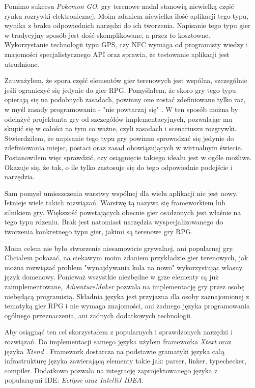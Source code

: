 \documentclass[openright]{xmgr}
\begin{document}
Pomimo sukcesu \textit{Pokemon GO}, gry terenowe nadal stanowią niewielką część rynku rozrywki elektronicznej. Moim zdaniem niewielka ilość aplikacji tego typu, wynika z braku odpowiednich narzędzi do ich tworzenia. Napisanie tego typu gier w tradycyjny sposób jest dość skomplikowane, a przez to kosztowne. Wykorzystanie technologii typu GPS, czy NFC wymaga od programisty wiedzy i znajomości specjalistycznego API oraz sprawia, że testowanie aplikacji jest utrudnione.

Zauważyłem, że spora część elementów gier terenowych jest wspólna, szczególnie jeśli ograniczyć się jedynie do gier RPG. Pomyślałem, że skoro gry tego typu opierają się na podobnych zasadach, powinny one zostać zdefiniowane tylko raz, w myśl zasady programowania - "nie powtarzaj się" \cite{CleanCode:2005}. W ten sposób można by odciążyć projektanta gry od szczegółów implementacyjnych, pozwalając mu skupić się w całości na tym co ważne, czyli zasadach i scenariuszu rozgrywki. Stwierdziłem, że napisanie tego typu gry powinno sprowadzać się jedynie do zdefiniowania miejsc, postaci oraz zasad obowiązujących w wirtualnym świecie. Postanowiłem więc sprawdzić, czy osiągnięcie takiego ideału jest w ogóle możliwe. Okazuje się, że tak, o ile tylko zastosuje się do tego odpowiednie podejście i narzędzia.

Sam pomysł umieszczenia warstwy wspólnej dla wielu aplikacji nie jest nowy. Istnieje wiele takich rozwiązań. Warstwę tą nazywa się frameworkiem lub silnikiem gry. Większość powstających obecnie gier osadzonych jest właśnie na tego typu rdzeniu. Brak jest natomiast narzędzia wyspecjalizowanego do tworzenia konkretnego typu gier, jakimi są terenowe gry RPG.

Moim celem nie było stworzenie niesamowicie grywalnej, ani popularnej gry. Chciałem pokazać, na ciekawym moim zdaniem przykładzie gier terenowych, jak można rozwiązać problem "wynajdywania koła na nowo" wykorzystując własny język domenowy. Ponieważ wszystkie niezbędne w grze elementy są już zaimplementowane, \textit{AdventureMaker} pozwala na implementację gry przez osobę niebędącą programistą. Składnia języka jest przyjazna dla osoby zaznajomionej z tematyką gier RPG i nie wymaga znajomości, ani żadnego języka programowania ogólnego przeznaczenia, ani żadnych dodatkowych technologii.

Aby osiągnąć ten cel skorzystałem z popularnych i sprawdzonych narzędzi i rozwiązań. Do implementacji samego języka użyłem frameworka \textit{Xtext} oraz języka \textit{Xtend} \cite{Xtend:2017:Doc}. Framework dostarcza na podstawie gramatyki języka całą infrastrukturę języka zawierającą elementy takie jak: parser, linker, typechecker, compiler. Dodatkowo pozwala na integrację zaprojektowanego języka z popularnymi IDE: \textit{Eclipse} oraz \textit{IntelliJ IDEA}. 
\end{document}
